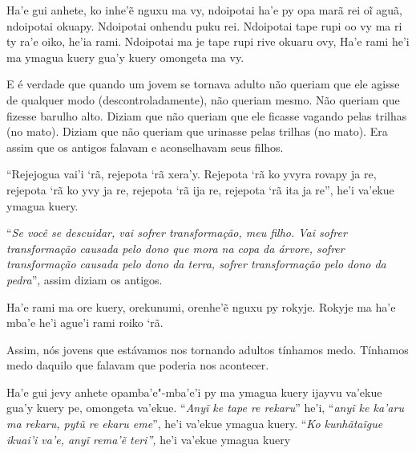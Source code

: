 \bigskip

\begin{paracol}{2}
\footnotesize
\bigskip
\medskip

\noindent
Ha'e gui anhete, ko inhe'ẽ nguxu ma vy, ndoipotai ha'e py opa marã rei
oĩ aguã, ndoipotai okuapy. Ndoipotai onhendu puku rei. Ndoipotai tape
rupi oo vy ma ri ty ra'e oiko, he'ia rami. Ndoipotai ma je tape rupi
rive okuaru ovy, Ha'e rami he'i ma ymagua kuery gua'y kuery omongeta ma
vy.

\bigskip
\medskip

\switchcolumn
\noindent
E é verdade que quando um jovem se tornava adulto não queriam que ele
agisse de qualquer modo (descontroladamente), não queriam mesmo. Não
queriam que fizesse barulho alto. Diziam que não queriam que ele
ficasse vagando pelas trilhas (no mato). Diziam que não queriam que
urinasse pelas trilhas (no mato). Era assim que os antigos falavam e
aconselhavam seus filhos. 

\smallskip

\switchcolumn
\noindent
``Rejejogua vai’i ‘rã, rejepota ‘rã xera’y. Rejepota ‘rã ko yvyra rovapy
ja re, rejepota ‘rã ko yvy ja re, rejepota ‘rã ija re, rejepota ‘rã ita
ja re'', he’i va’ekue ymagua kuery. 

\bigskip

\switchcolumn
\noindent
``\emph{Se você se descuidar, vai sofrer transformação, meu filho. Vai
sofrer transformação causada pelo dono que mora na copa da árvore,
sofrer transformação causada pelo dono da terra, sofrer transformação
pelo dono da pedra}'', assim diziam os antigos.

\smallskip

\switchcolumn
\noindent
Ha'e rami ma ore kuery, orekunumi, orenhe'ẽ nguxu py rokyje. Rokyje ma
ha'e mba'e he'i ague'i rami roiko `rã.

\bigskip

\switchcolumn
\noindent
Assim, nós jovens que estávamos nos tornando adultos tínhamos medo.
Tínhamos medo daquilo que falavam que poderia nos acontecer. 

\smallskip

\switchcolumn
\noindent
Ha'e gui jevy anhete opamba'e"-mba'e'i py ma ymagua kuery ijayvu va'ekue
gua'y kuery pe, omongeta va'ekue. ``\emph{Anyĩ ke tape re rekaru}''
he'i, ``\emph{anyĩ ke ka'aru ma rekaru, pytũ re ekaru eme}'', he'i
va'ekue ymagua kuery. ``\emph{Ko kunhãtaĩgue ikuai'i va'e, anyĩ rema'ẽ
teri'',} he'i va'ekue ymagua kuery


\end{paracol}
